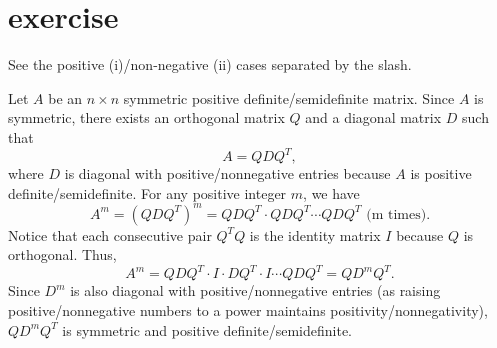 \documentclass{article}
\begin{document}
\section{exercise}
See the positive (i)/non-negative (ii) cases separated by the slash.

Let \( A \) be an \( n \times n \) symmetric positive definite/semidefinite matrix.
Since \( A \) is symmetric,
there exists an orthogonal matrix \( Q \) and a diagonal matrix \( D \) such that
\[
    A = Q D Q^T,
\]
where \( D \) is diagonal with positive/nonnegative entries
because \( A \) is positive definite/semidefinite.
For any positive integer \( m \), we have
\[
    A^m = (Q D Q^T)^m = Q D Q^T \cdot Q D Q^T \cdots Q D Q^T \text{ (m times)}.
\]
Notice that each consecutive pair \( Q^T Q \) is the identity matrix \( I \)
because \( Q \) is orthogonal. Thus,
\[
    A^m = Q D Q^T \cdot I \cdot D Q^T \cdot I \cdots Q D Q^T = Q D^m Q^T.
\]
Since \( D^m \) is also diagonal with positive/nonnegative entries
(as raising positive/nonnegative numbers
to a power maintains positivity/nonnegativity),
\( Q D^m Q^T \) is symmetric and positive definite/semidefinite.
\end{document}
